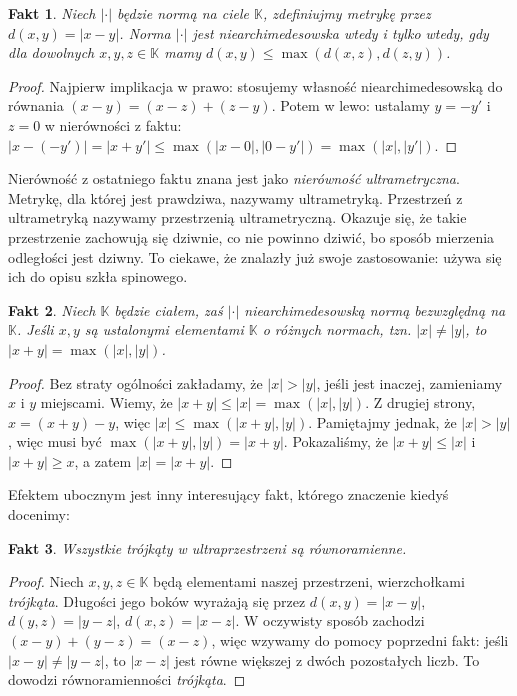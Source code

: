 \documentclass[a4paper,fleqn,9pt]{extarticle}
\newtheorem{fkt}{Fakt}
\begin{document}
\begin{fkt}
Niech $|\cdot|$ będzie normą na ciele $\mathbb K$, zdefiniujmy metrykę przez $d(x,y) = |x-y|$.
Norma $|\cdot|$ jest niearchimedesowska wtedy i tylko wtedy, gdy dla dowolnych $x,y,z\in\mathbb K$ mamy $d(x,y) \le \max(d(x,z), d(z,y))$.
\end{fkt}

\begin{proof}
Najpierw implikacja w prawo: stosujemy własność niearchimedesowską do równania $(x-y) = (x-z) + (z-y)$.
Potem w lewo: ustalamy $y = -y'$ i $z=0$ w nierówności z faktu: $|x- (-y')| = |x+y'| \le \max (|x-0|, |0-y'|) = \max (|x|, |y'|)$.
\end{proof}

Nierówność z ostatniego faktu znana jest jako \emph{nierówność ultrametryczna}.
Metrykę, dla której jest prawdziwa, nazywamy ultrametryką. 
Przestrzeń z ultrametryką nazywamy przestrzenią ultrametryczną. 
Okazuje się, że takie przestrzenie zachowują się dziwnie, co nie powinno dziwić, bo sposób mierzenia odległości jest dziwny.
To ciekawe, że znalazły już swoje zastosowanie: używa się ich do opisu szkła spinowego.

\begin{fkt}
Niech $\mathbb K$ będzie ciałem, zaś $|\cdot|$ niearchimedesowską normą bezwzględną na $\mathbb K$.
Jeśli $x, y$ są ustalonymi elementami $\mathbb K$ o różnych normach, tzn. $|x| \neq |y|$, to $|x+y| = \max(|x|, |y|)$.
\end{fkt}

\begin{proof}
Bez straty ogólności zakładamy, że $|x| > |y|$, jeśli jest inaczej, zamieniamy $x$ i $y$ miejscami.
Wiemy, że $|x+y| \le |x| = \max(|x|, |y|)$.
Z drugiej strony, $x = (x+y) - y$, więc $|x| \le \max(|x+y|, |y|)$.
Pamiętajmy jednak, że $|x| > |y|$, więc musi być $\max(|x+y|, |y|) = |x+y|$.
Pokazaliśmy, że $|x+y| \le |x|$ i $|x+y| \ge x$, a zatem $|x| = |x+y|$.
\end{proof}

Efektem ubocznym jest inny interesujący fakt, którego znaczenie kiedyś docenimy:

\begin{fkt}
Wszystkie \emph{trójkąty} w ultraprzestrzeni są równoramienne.
\end{fkt}

\begin{proof}
Niech $x,y,z\in\mathbb K$ będą elementami naszej przestrzeni, wierzchołkami \emph{trójkąta}.
Długości jego boków wyrażają się przez $d(x,y) = |x-y|$, $d(y,z) = |y-z|$, $d(x,z) = |x-z|$.
W oczywisty sposób zachodzi $(x-y) + (y-z) = (x-z)$, więc wzywamy do pomocy poprzedni fakt: jeśli $|x-y| \neq |y-z|$, to $|x-z|$ jest równe większej z dwóch pozostałych liczb.
To dowodzi równoramienności \emph{trójkąta}.
\end{proof}
\end{document}
